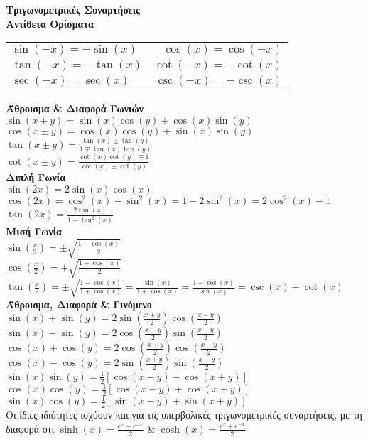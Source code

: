 \documentclass[a4paper, 12pt]{article}
\begin{document}
\textbf{Τριγωνομετρικές Συναρτήσεις}\\

\textbf{Aντίθετα Ορίσματα} \\
\noindent
\begin{tabular}{lr}
  $\sin(-x)=-\sin(x)$ & $\cos(x)=\cos(-x)$ \\
  $\tan(-x)=-\tan(x)$ & $\cot(-x)=-\cot(x)$ \\
  $\sec(-x)=\sec(x)$  & $\csc(-x)=-\csc(x)$ \\
\end{tabular}

\textbf{Άθροισμα \& Διαφορά Γωνιών} \\
\noindent
  $\sin(x \pm y)=\sin(x)\cos(y)\pm\cos(x)\sin(y)$ \\
  $\cos(x \pm y)=\cos(x)\cos(y)\mp\sin(x)\sin(y)$ \\
  $\tan(x \pm y)=\frac{\tan(x)\pm\tan(y)}{1\mp\tan(x)\tan(y)}$ \\
  $\cot(x \pm y)=\frac{\cot(x)\cot(y)\mp1}{\cot(x)\pm\cot(y)}$ \\

\textbf{Διπλή Γωνία} \\
\noindent
  $\sin(2x)=2\sin(x)\cos(x)$ \\
  $\cos(2x)=\cos^2(x)-\sin^2(x)=1-2\sin^2(x)=2\cos^2(x)-1$ \\
  $\tan(2x)=\frac{2\tan(x)}{1-\tan^2(x)}$ \\

\textbf{Μισή Γωνία} \\
\noindent
  $\sin(\frac{x}{2})=\pm\sqrt{\frac{1-\cos(x)}{2}}$ \\
  $\cos(\frac{x}{2})=\pm\sqrt{\frac{1+\cos(x)}{2}}$ \\
  $\tan(\frac{x}{2})=\pm\sqrt{\frac{1-\cos(x)}{1+\cos(x)}}=\frac{\sin(x)}{1+\cos(x)}=
  \frac{1-\cos(x)}{\sin(x)}=\csc(x)-\cot(x)$ \\

\textbf{Άθροισμα, Διαφορά \& Γινόμενο} \\
\noindent
  $\sin(x)+\sin(y)=2\sin(\frac{x+y}{2})\cos(\frac{x-y}{2})$ \\ 
  $\sin(x)-\sin(y)=2\cos(\frac{x+y}{2})\sin(\frac{x-y}{2})$ \\ 
  $\cos(x)+\cos(y)=2\cos(\frac{x+y}{2})\cos(\frac{x-y}{2})$ \\ 
  $\cos(x)-\cos(y)=2\sin(\frac{x+y}{2})\sin(\frac{x-y}{2})$ \\ 
  $\sin(x)\sin(y)=\frac{1}{2}[\cos(x-y)-\cos(x+y)]$ \\
  $\cos(x)\cos(y)=\frac{1}{2}[\cos(x-y)+\cos(x+y)]$ \\
  $\sin(x)\cos(y)=\frac{1}{2}[\sin(x-y)+\sin(x+y)]$ \\
  
Οι ίδιες ιδιότητες ισχύουν και για τις υπερβολικές τριγωνομετρικές συναρτήσεις,
με τη διαφορά ότι $\sinh(x)=\frac{e^{x}-e^{-x}}{2}$ \&
$\cosh(x)=\frac{e^{x}+e^{-x}}{2}$
\end{document}
